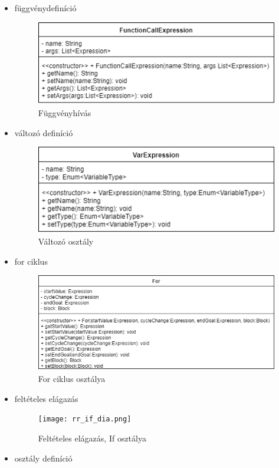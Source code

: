 \begin{itemize}
\item függvénydefiníció
\begin{figure}
\centering
\includegraphics[scale=1]{kepek/rr_funccallexpr_dia.png}
\caption{Függvényhívás}
\label{fig:process}
\end{figure}
\item változó definíció
\begin{figure}
\centering
\includegraphics[scale=1]{kepek/rr_var_dia.png}
\caption{Változó osztály}
\label{fig:process}
\end{figure}
\item for ciklus
\begin{figure}
\centering
\includegraphics[scale=1]{kepek/rr_for_dia.png}
\caption{For ciklus osztálya}
\label{fig:process}
\end{figure}
\item feltételes elágazás
\begin{figure}
\centering
\texttt{[image: rr\_if\_dia.png]}
\caption{Feltételes elágazás, If osztálya}
\label{fig:process}
\end{figure}
\item osztály definíció

\end{itemize}
